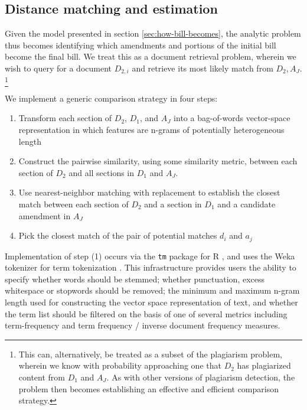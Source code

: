 \documentclass[11pt]{article}
\begin{document}
\subsection{Distance matching and estimation}
\label{sec:dist-match-estim}

Given the model presented in section \ref{sec:how-bill-becomes}, the
analytic problem thus becomes identifying which amendments and
portions of the initial bill become the final bill. We treat this as a
document retrieval problem, wherein we wish to query for a document
$D_{2,i}$ and retrieve its most likely match from $D_2,
A_J$. \footnote{This can, alternatively, be treated as a
subset of the plagiarism problem, wherein we know with probability
approaching one that $D_2$ has plagiarized content from $D_1$ and
$A_J$. As with other versions of plagiarism detection, the problem
then becomes establishing an effective and efficient comparison
strategy.}

We implement a generic comparison strategy in four steps:
\begin{enumerate}
\item Transform each section of $D_2$, $D_1$, and $A_J$ into a
  bag-of-words vector-space representation in which features are
  n-grams of potentially heterogeneous length
\item Construct the pairwise similarity, using some similarity metric,
  between each section of $D_2$ and all sections in $D_1$ and $A_J$.
\item Use nearest-neighbor matching with replacement to establish
  the closest match between each section of $D_2$ and a section in
  $D_1$ and a candidate amendment in $A_J$
\item Pick the closest match of the pair of potential matches $d_i$
  and $a_j$
\end{enumerate}

Implementation of step (1) occurs via the \texttt{tm} package for R
\citep{meyer2008text}, and uses the Weka tokenizer for term
tokenization \citep{hall2009weka}. This infrastructure provides users
the ability to specify whether words should be stemmed; whether
punctuation, excess whitespace or stopwords should be removed; the
minimum and maximum n-gram length used for constructing the vector
space representation of text, and whether the term list should be
filtered on the basis of one of several metrics including
term-frequency and term frequency / inverse document frequency
measures.
\end{document}

